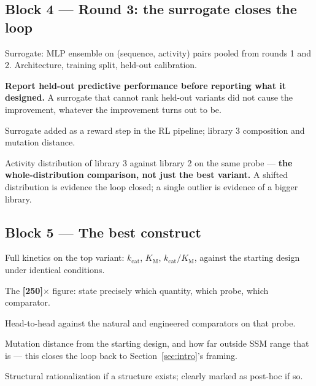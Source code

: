 \subsection*{Block 4 --- Round 3: the surrogate closes the loop}
\begin{planlist}
  \item Surrogate: MLP ensemble on (sequence, activity) pairs pooled from
        rounds 1 and 2. Architecture, training split, held-out calibration.
  \item \textbf{Report held-out predictive performance before reporting what it
        designed.} A surrogate that cannot rank held-out variants did not cause
        the improvement, whatever the improvement turns out to be.
  \item Surrogate added as a reward step in the RL pipeline; library 3
        composition and mutation distance.
  \item Activity distribution of library 3 against library 2 on the same probe
        --- \textbf{the whole-distribution comparison, not just the best
        variant.} A shifted distribution is evidence the loop closed; a single
        outlier is evidence of a bigger library.
\end{planlist}

\subsection*{Block 5 --- The best construct}
\begin{planlist}
  \item Full kinetics on the top variant: $k_\mathrm{cat}$, $K_\mathrm{M}$,
        $k_\mathrm{cat}/K_\mathrm{M}$, against the starting design under
        identical conditions.
  \item The \textbf{[250]}$\times$ figure: state precisely which quantity, which
        probe, which comparator.
  \item Head-to-head against the natural and engineered comparators on that
        probe.
  \item Mutation distance from the starting design, and how far outside SSM
        range that is --- this closes the loop back to
        Section~\ref{sec:intro}'s framing.
  \item Structural rationalization if a structure exists; clearly marked as
        post-hoc if so.
\end{planlist}


